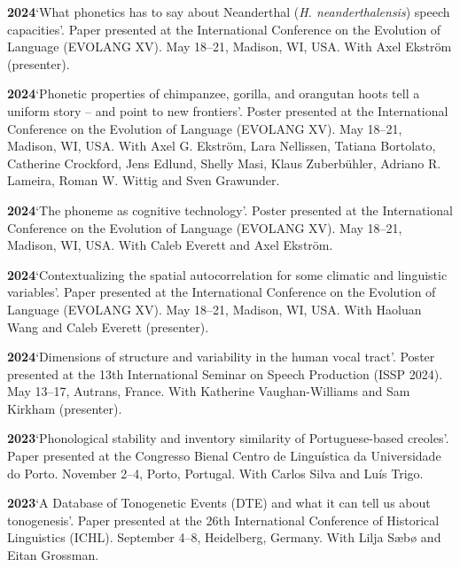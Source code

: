 \documentclass[11pt]{article}
\newcommand{\hangpara}{
 \setlength{\parindent}{0in} %
 \hangindent=0.42in %
}
\begin{document}
\hangpara
\vskip 6pt
{\bf 2024}\hspace{1ex}`What phonetics has to say about Neanderthal (\textit{H. neanderthalensis}) speech capacities'. Paper presented at the International Conference on the Evolution of Language (EVOLANG XV). May 18--21, Madison, WI, USA. With Axel Ekström (presenter).

\hangpara
\vskip 6pt
{\bf 2024}\hspace{1ex}`Phonetic properties of chimpanzee, gorilla, and orangutan hoots tell a uniform story -- and point to new frontiers'. Poster presented at the International Conference on the Evolution of Language (EVOLANG XV). May 18--21, Madison, WI, USA. With Axel G. Ekström, Lara Nellissen, Tatiana Bortolato, Catherine Crockford, Jens Edlund, Shelly Masi, Klaus Zuberbühler, Adriano R. Lameira, Roman W. Wittig and Sven Grawunder.

\hangpara
\vskip 6pt
{\bf 2024}\hspace{1ex}`The phoneme as cognitive technology'. Poster presented at the International Conference on the Evolution of Language (EVOLANG XV). May 18--21, Madison, WI, USA. With Caleb Everett and Axel Ekström.

\hangpara
\vskip 6pt
{\bf 2024}\hspace{1ex}`Contextualizing the spatial autocorrelation for some climatic and linguistic variables'. Paper presented at the International Conference on the Evolution of Language (EVOLANG XV). May 18--21, Madison, WI, USA. With Haoluan Wang and Caleb Everett (presenter).

\hangpara
\vskip 6pt
{\bf 2024}\hspace{1ex}`Dimensions of structure and variability in the human vocal tract'. Poster presented at the 13th International Seminar on Speech Production (ISSP 2024). May 13--17, Autrans, France. With Katherine Vaughan-Williams and Sam Kirkham (presenter).

\hangpara
\vskip 6pt
{\bf 2023}\hspace{1ex}`Phonological stability and inventory similarity of Portuguese-based creoles'. Paper presented at the Congresso Bienal Centro de Linguística da Universidade do Porto. November 2--4, Porto, Portugal. With Carlos Silva and Luís Trigo. %

\hangpara
\vskip 6pt
{\bf 2023}\hspace{1ex}`A Database of Tonogenetic Events (DTE) and what it can tell us about tonogenesis'. Paper presented at the 26th International Conference of Historical Linguistics (ICHL). September 4--8, Heidelberg, Germany. With Lilja Sæbø and Eitan Grossman.
\end{document}
